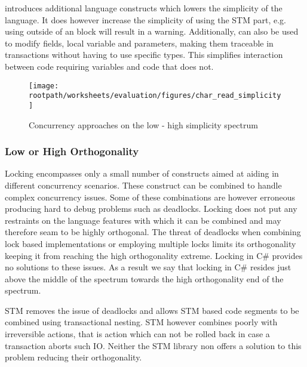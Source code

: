 \stmnamesp introduces additional language constructs which lowers the simplicity of the language. It does however increase the simplicity of using the \ac{STM} part, e.g. using  outside of an  block will result in a warning. Additionally,  can also be used to modify fields, local variable and parameters, making them traceable in transactions without having to use specific types. This simplifies interaction between code requiring  variables and code that does not. 




\begin{figure}[htbp]
\centering
 \texttt{[image: \\rootpath/worksheets/evaluation/figures/char\_read\_simplicity]} 
 \caption{Concurrency approaches on the low - high simplicity spectrum}
\label{fig:char_simplicity}
\end{figure}
\subsubsection{Low or High Orthogonality}\label{subsec:orthogonality}
Locking encompasses only a small number of constructs aimed at aiding in different concurrency scenarios. These construct can be combined to handle complex concurrency issues. Some of these combinations are however erroneous producing hard to debug problems such as deadlocks. Locking does not put any restraints on the language features with which it can be combined and may therefore seam to be highly orthogonal. The threat  of deadlocks when combining lock based implementations or employing multiple locks limits its orthogonality keeping it from reaching the high orthogonality extreme. Locking in C\# provides no solutions to these issues. As a result we say that locking in C\# resides just above the middle of the spectrum towards the high orthogonality end of the spectrum.

\ac{STM} removes the issue of deadlocks and allows \ac{STM} based code segments to be combined using transactional nesting. \ac{STM} however combines poorly with irreversible actions, that is action which can not be rolled back in case a transaction aborts such \ac{IO}. Neither the \ac{STM} library non \stmnamesp offers a solution to this problem reducing their orthogonality. 

